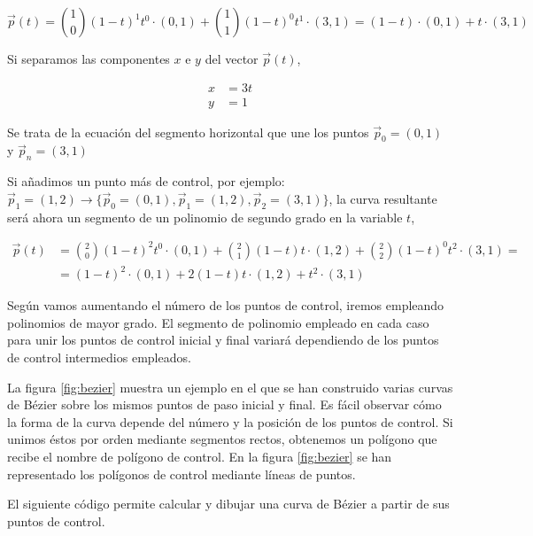 \begin{equation*}
\vec{p}(t) = \binom{1}{0}\left(1-t\right)^{1}t^0  \cdot (0,1) +  \binom{1}{1}\left(1-t\right)^{0}t^1  \cdot (3,1) = \left(1-t\right)  \cdot (0,1) + t\cdot (3,1)
\end{equation*} 
\begin{paracol}{2}
Si separamos las componentes $x$ e $y$ del vector $\vec{p}(t)$,
\end{paracol}

\begin{align*}
x &= 3t\\
y &= 1
\end{align*}
\begin{paracol}{2}
Se trata de la ecuación del segmento horizontal que une los puntos $\vec{p}_0 = (0,1)$ y $\vec{p}_n = (3,1)$ 

Si añadimos un punto más de control, por ejemplo:  $\vec{p}_1 = (1,2) \rightarrow \lbrace\vec{p}_0 = (0,1), \vec{p}_1 = (1,2), \vec{p}_2 = (3,1)\rbrace$,  la curva resultante será ahora un segmento de un polinomio de segundo grado en la variable $t$,
\end{paracol}
\begin{align*}
\vec{p}(t) &= \binom{2}{0}\left(1-t\right)^{2}t^0  \cdot (0,1) +  \binom{2}{1}\left(1-t\right)t \cdot (1,2) + \binom{2}{2}\left(1-t\right)^{0}t^2  \cdot (3,1) =\\
&= \left(1-t\right)^{2} \cdot (0,1) + 2 \left(1-t\right)t \cdot (1,2) + t^2  \cdot (3,1) 
\end{align*} 
\begin{paracol}{2}
Según vamos aumentando el número de los puntos de control, iremos empleando polinomios de mayor grado. El segmento de polinomio empleado en cada caso para unir los puntos de control inicial y final variará dependiendo de los puntos de control intermedios empleados.

La figura \ref{fig:bezier} muestra un ejemplo en el que se han construido varias curvas de Bézier sobre los mismos puntos de paso inicial y final. Es fácil observar cómo la forma de la curva depende del número y la posición de los puntos de control. Si unimos éstos por orden mediante segmentos rectos, obtenemos un polígono que recibe el nombre de polígono de control. En la figura \ref{fig:bezier} se han representado los polígonos de control mediante líneas de puntos.

El siguiente código permite calcular y dibujar una curva de Bézier a partir de sus puntos de control.
\end{paracol}
